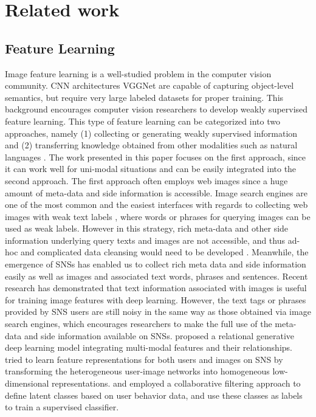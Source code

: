 \documentclass[letterpaper]{article} %
\begin{document}
\section{Related work}
\label{sec:related}

\subsection{Feature Learning}
\label{sec:related:learning}
\indent

Image feature learning is a well-studied problem in the computer vision community.
%
CNN architectures VGGNet \cite{Simonyan2014} are capable of capturing object-level semantics, but require very large labeled datasets for proper training.
%
This background encourages computer vision researchers to develop weakly supervised feature learning.
%
This type of feature learning can be categorized into two approaches, namely (1) collecting or generating weakly supervised information and (2) transferring knowledge obtained from other modalities such as natural languages \cite{Socher2013,Silberer2014,Hoffman2016,Changpinyo2016}.
%
The work presented in this paper focuses on the first approach, since it can work well for uni-modal situations and can be easily integrated into the second approach.
%
The first approach often employs web images since a huge amount of meta-data and side information is accessible.
%
Image search engines are one of the most common and the easiest interfaces with regards to collecting web images with weak text labels \cite{Sukhbaatar2015}, where words or phrases for querying images can be used as weak labels.
%
However in this strategy, rich meta-data and other side information underlying query texts and images are not accessible, and thus ad-hoc and complicated data cleansing would need to be developed \cite{Yashima2016}.
%
Meanwhile, the emergence of SNSs has enabled us to collect rich meta data and side information easily as well as images and associated text words, phrases and sentences.
%
Recent research \cite{Joulin2016} has demonstrated that text information associated with images is useful for training image features with deep learning.
%
However, the text tags or phrases provided by SNS users are still noisy in the same way as those obtained via image search engines, which encourages researchers to make the full use of the meta-data and side information available on SNSs.
%
\cite{Yuan2013} proposed a relational generative deep learning model integrating multi-modal features and their relationships.
%
\cite{Geng2015} tried to learn feature representations for both users and images on SNS by transforming the heterogeneous user-image networks into homogeneous low-dimensional representations.
%
\cite{Fang2015} and \cite{Zhang2016} employed a collaborative filtering approach to define latent classes based on user behavior data, and use these classes as labels to train a supervised classifier.
\end{document}
